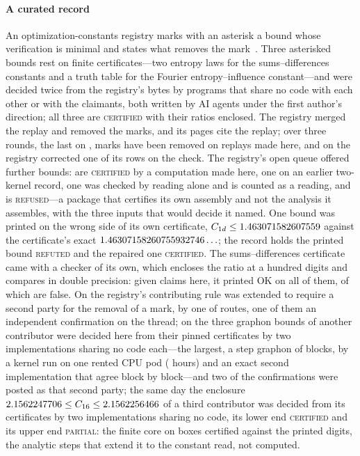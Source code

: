 \documentclass[preprint,11pt,a4paper]{elsarticle}
\theoremstyle{definition}
\newcommand{\verdict}[1]{\textup{\textsc{#1}}}
\newcommand{\CERT}{\verdict{certified}}
\newcommand{\REFT}{\verdict{refuted}}
\newcommand{\REFS}{\verdict{refused}}
\begin{document}
\paragraph{A curated record}
An optimization-constants registry marks with an asterisk a bound whose verification is minimal and states what removes the mark~\citep{OptConst,OptConstRule}. Three asterisked bounds rest on finite certificates---two entropy laws for the sums--differences constants and a truth table for the Fourier entropy--influence constant---and were decided twice from the registry's bytes by programs that share no code with each other or with the claimants, both written by AI agents under the first author's direction; all three are \CERT{} with their ratios enclosed. The registry merged the replay and removed the marks, and its pages cite the replay; over three rounds, the last on \MtRgThirdDate, \MtRgMarksTotalWord{} marks have been removed on replays made here, and on \MtRgCorrectedDate{} the registry corrected one of its rows on the check. The registry's open queue offered \MtRqRows{} further bounds: \MtRqComputedCertified{} are \CERT{} by a computation made here, one on an earlier two-kernel record, one was checked by reading alone and is counted as a reading, and \MtRqRefused{} is \REFS---a package that certifies its own assembly and not the analysis it assembles, with the three inputs that would decide it named. One bound was printed on the wrong side of its own certificate, $C_{1d}\le1.463071582607559$ against the certificate's exact $1.46307158260755932746\ldots$; the record holds the printed bound \REFT{} and the repaired one \CERT. The sums--differences certificate came with a checker of its own, which encloses the ratio at a hundred digits and compares in double precision: given \MtEvCheckerRuns{} claims here, it printed OK on all of them, \MtEvCheckerFalse{} of which are false. On \MtRgThirdDate{} the registry's contributing rule was extended to require a second party for the removal of a mark, by one of \MtRgRuleRoutesWord{} routes, one of them an independent confirmation on the thread; on \MtGnDate{} the three graphon bounds of another contributor were decided here from their pinned certificates by two implementations sharing no code each---the largest, a step graphon of \MtGnKfBlocks{} blocks, by a kernel run on one rented CPU pod (\MtGnKfPodHours{} hours) and an exact second implementation that agree block by block---and two of the confirmations were posted as that second party; the same day the enclosure $2.1562247706\le C_{16}\le2.1562256466$ of a third contributor was decided from its certificates by two implementations sharing no code, its lower end \CERT{} and its upper end \verdict{partial}: the finite core on \MtCsBoxes{} boxes certified against the printed digits, the analytic steps that extend it to the constant read, not computed.
\end{document}
